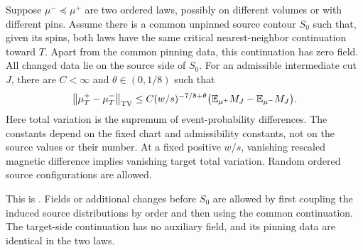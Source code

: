 \begin{corollary}
\label{in:ordered}
Suppose $\mu^-\preceq\mu^+$ are two ordered laws, possibly on
different volumes or with different pins. Assume there is a common
unpinned source contour $S_0$ such that, given its spins, both laws
have the same critical nearest-neighbor continuation toward $T$.
Apart from the common pinning data, this continuation has zero field.
All changed data lie on the source side of $S_0$. For an admissible
intermediate cut $J$, there are $C<\infty$ and
$\theta\in(0,1/8)$ such that
\begin{equation}\label{in:ordered-bound}
 \left\|\mu_T^+-\mu_T^-\right\|_{\operatorname{TV}}
 \leq C(w/s)^{-7/8+\theta}
       \bigl(\mathbb E_{\mu^+}M_J-\mathbb E_{\mu^-}M_J\bigr).
\end{equation}
Here total variation is the supremum of event-probability differences.
The constants depend on the fixed chart and admissibility constants,
not on the source values or their number. At a fixed positive $w/s$,
vanishing rescaled magnetic difference implies vanishing target total
variation. Random ordered source configurations are allowed.
\end{corollary}

This is \cite[Corollary~4.12, with Definition~4.1 and
Corollary~4.11]{IsingToolkit}.
Fields or additional changes before $S_0$ are allowed by first coupling
the induced source distributions by order and then using the common
continuation. The target-side continuation has no auxiliary field,
and its pinning data are identical in the two laws.

